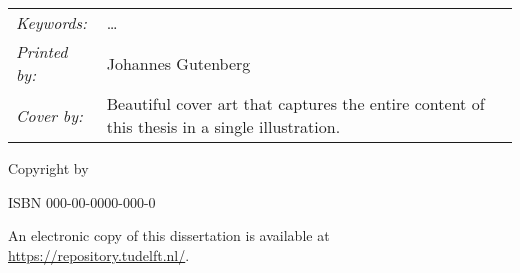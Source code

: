 \begin{titlepage}
    \vfill
    \begin{center}
    \end{center}
    \vfill

    \noindent
    \begin{tabular}{@{}p{}@{}p{}@{}}
        \textit{Keywords:}    & \ldots                                                                                        \\[\medskipamount]
        \textit{Printed by:}   & Johannes Gutenberg                                                                            \\[\medskipamount]
        \textit{Cover by:} & Beautiful cover art that captures the entire content of this thesis in a single illustration.
    \end{tabular}

    \vspace{4\bigskipamount}

    \noindent Copyright \textcopyright{} \the\year{} by{
        \makeatletter
        \makeatother
    }


    \medskip
    \noindent ISBN 000-00-0000-000-0

    \medskip
    \noindent An electronic copy of this dissertation is available at\\
    \url{https://repository.tudelft.nl/}.

\end{titlepage}

